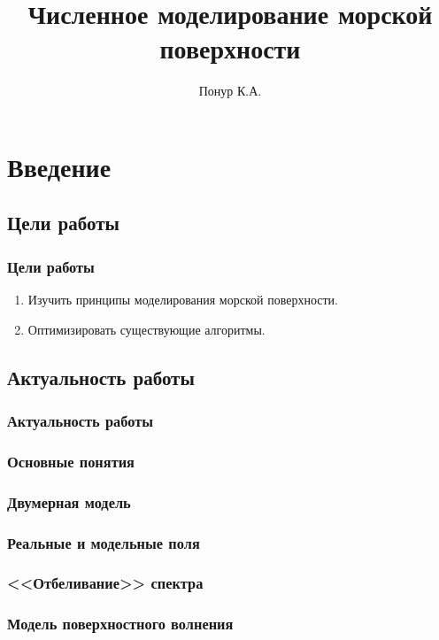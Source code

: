 \documentclass[10pt,pdf,hyperref={unicode}, dvipsnames]{beamer}
\begin{document}
\title[Измерение плотности плазмы]{Численное моделирование морской поверхности}

\author{%
	Понур К.А. %
}




\section{Введение}
\subsection{Цели работы}
\begin{frame}[t]
	\frametitle{Цели работы}
		\vfill
		\begin{enumerate}
			\item Изучить принципы моделирования морской поверхности.

			\item Оптимизировать существующие алгоритмы.


		\end{enumerate}
		\vfill
\end{frame}
\subsection{Актуальность работы}
\begin{frame}[t]

	\frametitle{Актуальность работы}

\end{frame}


\begin{frame}
	\frametitle{Основные понятия}

\end{frame}

\begin{frame}[t]

	\frametitle{Двумерная модель}
    
\end{frame}


\begin{frame}[t]

	\frametitle{Реальные и модельные поля}
    
\end{frame}

\begin{frame}[t]
	
	\frametitle{<<Отбеливание>> спектра}
   
\end{frame}

\begin{frame}[t]

	\frametitle{Модель поверхностного волнения}
    
\end{frame}
\end{document}
